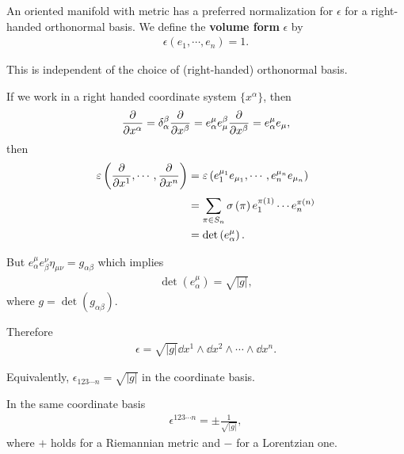 
An oriented manifold with metric has a preferred normalization for $\epsilon$ for a right-handed orthonormal basis. We define the \textbf{volume form} $\epsilon$ by
\begin{align}
    \epsilon \left( e_1, \cdots, e_n \right) = 1
.\end{align}

This is independent of the choice of (right-handed) orthonormal basis.

If we work in a right handed coordinate system $\{x^{\alpha}\}$, then
\begin{align}
    \pdv{x^{\alpha}} = \delta_{\alpha}^{\beta}\pdv{x^{\beta}}= e_{\alpha}^{\mu} e^{\beta}_{\mu} \pdv{x^{\beta}} = e_{\alpha}^{\mu} e_{\mu}
,\end{align}
then
\begin{align}
    \varepsilon \left( \pdv{x^{1}} , \cdots, \pdv{x^{n}}\right)  &= \varepsilon \left( e_1^{\mu_1} e_{\mu_1} , \cdots, e_n^{\mu_n} e_{\mu_n} \right)  \\
    &= \sum_{\pi \in S_n}^{} \sigma \left( \pi \right) e_1^{\pi \left( 1 \right) } \cdots e_n^{\pi \left( n \right) } \\
    &= \det \left( e_\alpha^{\mu} \right) 
.\end{align}

But $e_\alpha^{\mu} e_{\beta}^{\nu} \eta_{\mu \nu} = g_{\alpha \beta}$ which implies
\begin{align}
    \det \left( e_{\alpha}^{\mu} \right) = \sqrt{\left| g \right| } 
,\end{align}
where $g = \det \left( g_{\alpha \beta} \right) $.

Therefore
\begin{align}
    \epsilon = \sqrt{\left| g \right| } \dd{x}^{1} \wedge \dd{x}^{2} \wedge \cdots \wedge \dd{x}^{n}
.\end{align}

Equivalently, $\epsilon_{123\cdots n} = \sqrt{\left| g \right| } $ in the coordinate basis.

\begin{exercise}
    In the same coordinate basis
    \begin{align}
        \epsilon^{123 \cdots n} = \pm \frac{1}{\sqrt{\left| g \right| } }
    ,\end{align}
    where $+$ holds for a Riemannian metric and $-$ for a Lorentzian one.
\end{exercise}

